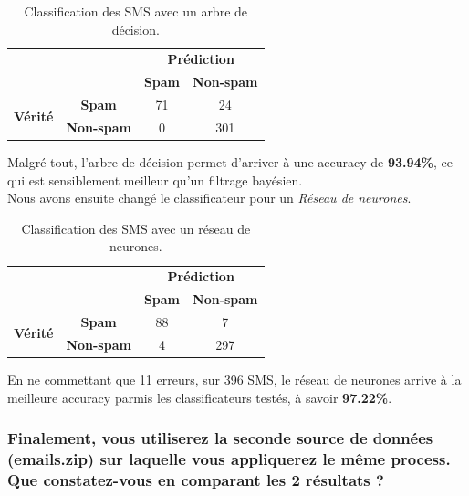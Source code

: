 \documentclass[a4paper]{article}
\begin{document}
\begin{table}[H]
	\centering
	\def\arraystretch{2.0}
	\begin{tabular}{cccl}
	& \textbf{}
	& \multicolumn{2}{c}{\textbf{Prédiction}}\\ \cline{3-4}
	& \multicolumn{1}{c|}{}
	& \multicolumn{1}{c|}{\textbf{Spam}}
	& \multicolumn{1}{c|}{\textbf{Non-spam}} \\ \cline{2-4} 
	\multicolumn{1}{c|}{\multirow{2}{*}{\textbf{Vérité}}}
	& \multicolumn{1}{c|}{\textbf{Spam}}
	& \multicolumn{1}{c|}{71}
	& \multicolumn{1}{c|}{24}\\ \cline{2-4} 
	\multicolumn{1}{c|}{}
	& \multicolumn{1}{c|}{\textbf{Non-spam}}
	& \multicolumn{1}{c|}{0}
	& \multicolumn{1}{c|}{301}\\ \cline{2-4} 
	\end{tabular}
	\caption{Classification des SMS avec un arbre de décision.}
\end{table}

Malgré tout, l'arbre de décision permet d'arriver à une accuracy de \textbf{93.94\%}, ce qui est sensiblement meilleur qu'un filtrage bayésien.
\\

Nous avons ensuite changé le classificateur pour un \textit{Réseau de neurones}.

\begin{table}[H]
	\centering
	\begin{tabular}{cccl}
	\def\arraystretch{2.0}
	& \textbf{}
	& \multicolumn{2}{c}{\textbf{Prédiction}}\\ \cline{3-4}
	& \multicolumn{1}{c|}{}
	& \multicolumn{1}{c|}{\textbf{Spam}}
	& \multicolumn{1}{c|}{\textbf{Non-spam}} \\ \cline{2-4} 
	\multicolumn{1}{c|}{\multirow{2}{*}{\textbf{Vérité}}}
	& \multicolumn{1}{c|}{\textbf{Spam}}
	& \multicolumn{1}{c|}{88}
	& \multicolumn{1}{c|}{7}\\ \cline{2-4} 
	\multicolumn{1}{c|}{}
	& \multicolumn{1}{c|}{\textbf{Non-spam}}
	& \multicolumn{1}{c|}{4}
	& \multicolumn{1}{c|}{297}\\ \cline{2-4} 
	\end{tabular}
	\caption{Classification des SMS avec un réseau de neurones.}
\end{table}

En ne commettant que 11 erreurs, sur 396 SMS, le réseau de neurones arrive à la meilleure accuracy parmis les classificateurs testés, à savoir \textbf{97.22\%}.

\subsubsection*{Finalement, vous utiliserez la seconde source de données (emails.zip) sur laquelle vous appliquerez le même process. Que constatez-vous en comparant les 2 résultats ?}
\end{document}
